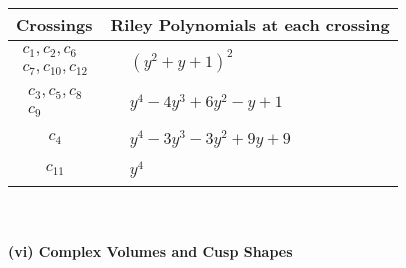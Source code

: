 \documentclass[1p]{elsarticle_modified}
\theoremstyle{definition}
\begin{document}
\begin{tabular}{m{50pt}|m{274pt}}
Crossings & \hspace{64pt}Riley Polynomials at each crossing \\
\hline $$\begin{aligned}c_{1},c_{2},c_{6}\\c_{7},c_{10},c_{12}\end{aligned}$$&$\begin{aligned}
&(y^2+y+1)^2
\end{aligned}$\\
\hline $$\begin{aligned}c_{3},c_{5},c_{8}\\c_{9}\end{aligned}$$&$\begin{aligned}
&y^4-4 y^3+6 y^2- y+1
\end{aligned}$\\
\hline $$\begin{aligned}c_{4}\end{aligned}$$&$\begin{aligned}
&y^4-3 y^3-3 y^2+9 y+9
\end{aligned}$\\
\hline $$\begin{aligned}c_{11}\end{aligned}$$&$\begin{aligned}
&y^4
\end{aligned}$\\
\hline
\end{tabular}\\~\\
\newpage\flushleft \textbf{(vi) Complex Volumes and Cusp Shapes}
\end{document}
